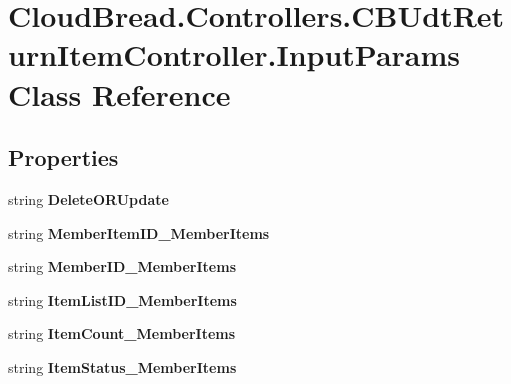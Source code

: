 \hypertarget{a00118}{}\section{Cloud\+Bread.\+Controllers.\+C\+B\+Udt\+Return\+Item\+Controller.\+Input\+Params Class Reference}
\label{a00118}
\subsection*{Properties}
\begin{DoxyCompactItemize}
\item 
string {\bfseries Delete\+O\+R\+Update}\hypertarget{a00118_a419e4b4c559dff1880ca907f4ce342fb}{}\label{a00118_a419e4b4c559dff1880ca907f4ce342fb}

\item 
string {\bfseries Member\+Item\+I\+D\+\_\+\+Member\+Items}\hypertarget{a00118_a52224baf1c38cb61f7bf63422e9d5959}{}\label{a00118_a52224baf1c38cb61f7bf63422e9d5959}

\item 
string {\bfseries Member\+I\+D\+\_\+\+Member\+Items}\hypertarget{a00118_a131338ec853de747eb24634af5656257}{}\label{a00118_a131338ec853de747eb24634af5656257}

\item 
string {\bfseries Item\+List\+I\+D\+\_\+\+Member\+Items}\hypertarget{a00118_a7af4e6ea991c25048148729a7d1574c6}{}\label{a00118_a7af4e6ea991c25048148729a7d1574c6}

\item 
string {\bfseries Item\+Count\+\_\+\+Member\+Items}\hypertarget{a00118_a79d435474857400866162d5f62caf976}{}\label{a00118_a79d435474857400866162d5f62caf976}

\item 
string {\bfseries Item\+Status\+\_\+\+Member\+Items}\hypertarget{a00118_a674b61d1b1ba56f18b587e2ac1f5ed26}{}\label{a00118_a674b61d1b1ba56f18b587e2ac1f5ed26}


\end{DoxyCompactItemize}
